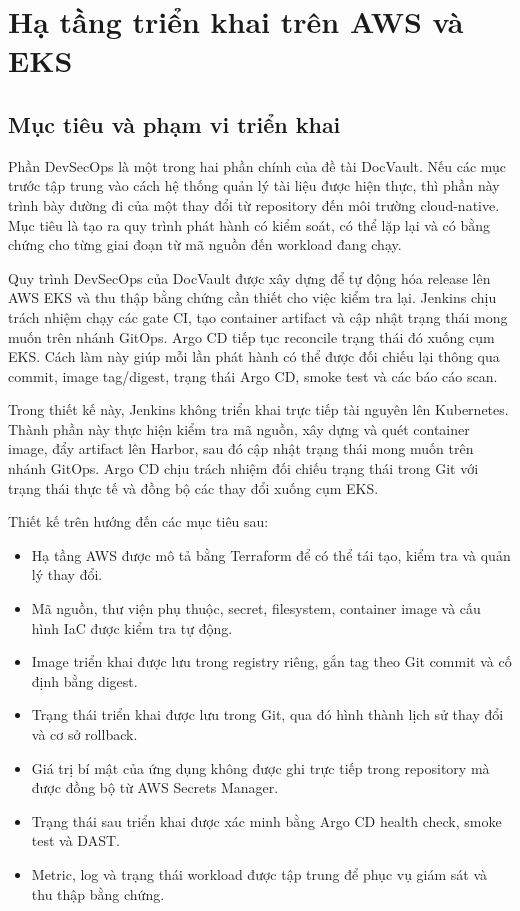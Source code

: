 \clearpage
\section{Hạ tầng triển khai trên AWS và EKS}

\subsection{Mục tiêu và phạm vi triển khai}

Phần DevSecOps là một trong hai phần chính của đề tài DocVault. Nếu các mục trước tập trung vào cách hệ thống quản lý tài liệu được hiện thực, thì phần này trình bày đường đi của một thay đổi từ repository đến môi trường cloud-native. Mục tiêu là tạo ra quy trình phát hành có kiểm soát, có thể lặp lại và có bằng chứng cho từng giai đoạn từ mã nguồn đến workload đang chạy.

Quy trình DevSecOps của DocVault được xây dựng để tự động hóa release lên AWS EKS và thu thập bằng chứng cần thiết cho việc kiểm tra lại. Jenkins chịu trách nhiệm chạy các gate CI, tạo container artifact và cập nhật trạng thái mong muốn trên nhánh GitOps. Argo CD tiếp tục reconcile trạng thái đó xuống cụm EKS. Cách làm này giúp mỗi lần phát hành có thể được đối chiếu lại thông qua commit, image tag/digest, trạng thái Argo CD, smoke test và các báo cáo scan.

Trong thiết kế này, Jenkins không triển khai trực tiếp tài nguyên lên Kubernetes. Thành phần này thực hiện kiểm tra mã nguồn, xây dựng và quét container image, đẩy artifact lên Harbor, sau đó cập nhật trạng thái mong muốn trên nhánh GitOps. Argo CD chịu trách nhiệm đối chiếu trạng thái trong Git với trạng thái thực tế và đồng bộ các thay đổi xuống cụm EKS.

Thiết kế trên hướng đến các mục tiêu sau:

\begin{itemize}
  \item Hạ tầng AWS được mô tả bằng Terraform để có thể tái tạo, kiểm tra và quản lý thay đổi.
  \item Mã nguồn, thư viện phụ thuộc, secret, filesystem, container image và cấu hình IaC được kiểm tra tự động.
  \item Image triển khai được lưu trong registry riêng, gắn tag theo Git commit và cố định bằng digest.
  \item Trạng thái triển khai được lưu trong Git, qua đó hình thành lịch sử thay đổi và cơ sở rollback.
  \item Giá trị bí mật của ứng dụng không được ghi trực tiếp trong repository mà được đồng bộ từ AWS Secrets Manager.
  \item Trạng thái sau triển khai được xác minh bằng Argo CD health check, smoke test và DAST.
  \item Metric, log và trạng thái workload được tập trung để phục vụ giám sát và thu thập bằng chứng.
\end{itemize}

